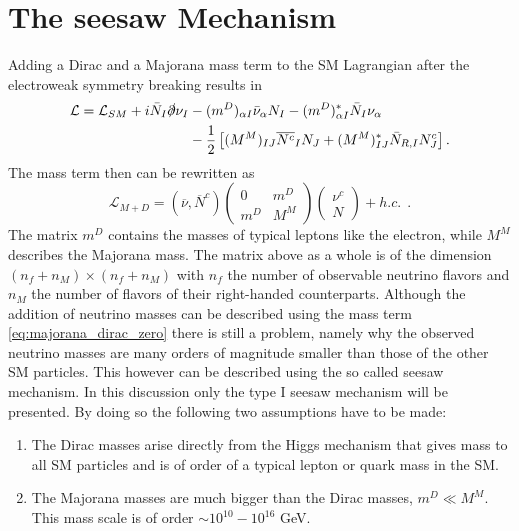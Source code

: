 \section{The seesaw Mechanism}
Adding a Dirac and a Majorana mass term to the SM Lagrangian after the electroweak symmetry breaking results in \cite[pp. 4f]{Drewes:2013gca}
\begin{align}
\mathcal{L}=\mathcal{L}_{SM}+i\bar{N}_{I}\slashed\partial\nu_{I}&-(m^D)_{\alpha I}\bar{\nu}_{\alpha}N_{I}-(m^D)_{\alpha I}^*\bar{N}_{I}\nu_{\alpha}
\label{eq:lagrangian_mass}
\\
&-\frac{1}{2}\left[(M^M)_{IJ}\overline{N^c}_{I}N_{J}+(M^M)^*_{IJ}\bar{N}_{R,I}N^c_{J}\right]\nonumber.
\end{align}
The mass term then can be rewritten as\cite[Eq. (12)]{Drewes:2013gca}
\begin{equation}
\mathcal{L}_{M+D}=\left(\overline{\nu},\overline{N}^c\right)	\left(\begin{array}{cc}0&m^D\\m^D&M^M\end{array}\right)	\left(\begin{array}{c}\nu^c\\N\end{array}\right)+h.c.\:\:.
\label{eq:majorana_dirac_zero}
\end{equation}
The matrix $m^D$ contains the masses of typical leptons like the electron, while $M^M$ describes the Majorana mass. The matrix above as a whole is of the dimension \newline $(n_f+n_M)\times(n_f+n_M)$ with $n_f$ the number of observable neutrino flavors and $n_M$ the number of flavors of their right-handed counterparts. \newline\indent
Although the addition of neutrino masses can be described using the mass term \eqref{eq:majorana_dirac_zero}
there is still a problem, namely why the observed neutrino masses are many orders of magnitude smaller than those of the other SM particles. This however can be described using the so called seesaw mechanism. In this discussion only the type I seesaw mechanism will be presented. By doing so the following two assumptions have to be made:
\begin{enumerate}
	\item The Dirac masses arise directly from the Higgs mechanism that gives mass to all SM particles and is of order of a typical lepton or quark mass in the SM.
	\item The Majorana masses are much bigger than the Dirac masses, $m^D\ll M^M$. This mass scale is of order $\sim10^{10}-10^{16}$ GeV.
\end{enumerate}
